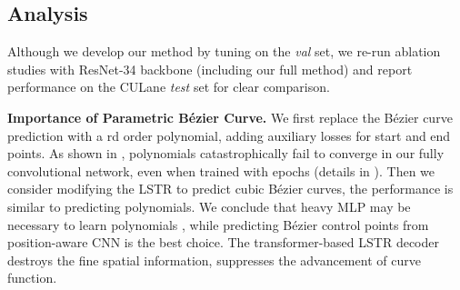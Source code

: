 \documentclass[10pt,twocolumn,letterpaper]{article}
\begin{document}
\subsection{Analysis}
\label{sec:analy}

Although we develop our method by tuning on the \textit{val} set, we re-run ablation studies with ResNet-34 backbone (including our full method) and report performance on the CULane \textit{test} set for clear comparison.

\begin{table}[ht]
    \centering
    \caption{Curve representations. Baselines directly predict curve coefficients without feature flip fusion.}
    \label{tab:ablrep}
    \vspace{-4mm}
\end{table}

\noindent \textbf{Importance of Parametric Bézier Curve.} We first replace the Bézier curve prediction with a rd order polynomial, adding auxiliary losses for start and end points.
As shown in , polynomials catastrophically fail to converge in our fully convolutional network, even when trained with  epochs (details in ).
Then we consider modifying the LSTR \cite{liu2021end} to predict cubic Bézier curves, the performance is similar to predicting polynomials. We conclude that heavy MLP may be necessary to learn polynomials \cite{tabelini2021polylanenet,liu2021end}, while predicting Bézier control points from position-aware CNN is the best choice. The transformer-based LSTR decoder destroys the fine spatial information, suppresses the advancement of curve function. 

         
         
\end{document}
